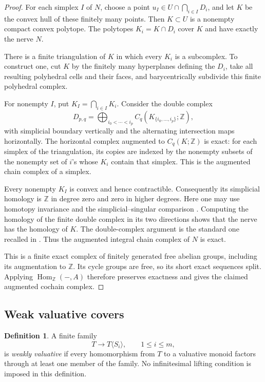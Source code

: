 \documentclass[11pt]{article}
\theoremstyle{definition}
\newtheorem{definition}[theorem]{Definition}
\theoremstyle{remark}
\DeclareMathOperator{\Hom}{Hom}
\newcommand{\ZZ}{\mathbb Z}
\begin{document}
\begin{proof}
For each simplex \(I\) of \(N\), choose a point
\(u_I\in U\cap\bigcap_{i\in I}D_i\), and let \(K\) be the convex hull
of these finitely many points. Then \(K\subset U\) is a nonempty
compact convex polytope. The polytopes \(K_i=K\cap D_i\) cover \(K\)
and have exactly the nerve \(N\).

There is a finite triangulation of \(K\) in which every \(K_i\) is
a subcomplex. To construct one, cut \(K\) by the finitely many
hyperplanes defining the \(D_i\), take all resulting polyhedral
cells and their faces, and barycentrically subdivide this finite
polyhedral complex.

For nonempty \(I\), put \(K_I=\bigcap_{i\in I}K_i\). Consider the
double complex
\[
D_{p,q}=
\bigoplus_{i_0<\cdots<i_p}
C_q(K_{\{i_0,\ldots,i_p\}};\ZZ),
\]
with simplicial boundary vertically and the alternating
intersection maps horizontally. The horizontal complex augmented
to \(C_q(K;\ZZ)\) is exact: for each simplex of the triangulation,
its copies are indexed by the nonempty subsets of the nonempty
set of \(i\)'s whose \(K_i\) contain that simplex. This is the
augmented chain complex of a simplex.

Every nonempty \(K_I\) is convex and hence contractible.
Consequently its simplicial homology is \(\ZZ\) in degree zero
and zero in higher degrees. Here one may use homotopy invariance
and the simplicial--singular comparison
\cite[Theorems~2.10 and~2.27]{Hatcher}.
Computing the homology of the finite double complex in its two
directions shows that the nerve has the homology of \(K\).
The double-complex argument is the standard one recalled in
\cite[Tag~012X]{Stacks}.
Thus the augmented integral chain complex of \(N\) is exact.

This is a finite exact complex of finitely generated free abelian
groups, including its augmentation to \(\ZZ\). Its cycle groups
are free, so its short exact sequences split. Applying
\(\Hom_{\ZZ}(-,A)\) therefore preserves exactness and gives the
claimed augmented cochain complex.
\end{proof}

\subsection{Weak valuative covers}

\begin{definition}\label{def:weak}
A finite family
\[
T\longrightarrow T\langle S_i\rangle,\qquad 1\le i\le m,
\]
is \emph{weakly valuative} if every homomorphism from \(T\) to a
valuative monoid factors through at least one member of the
family. No infinitesimal lifting condition is imposed in this
definition.
\end{definition}
\end{document}
